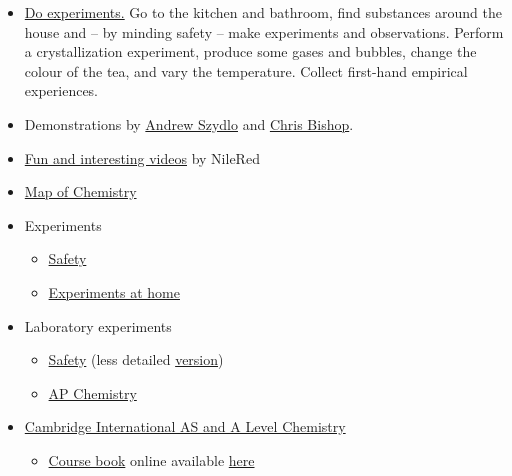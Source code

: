 \documentclass{article}
\begin{document}
\begin{itemize}
    \item \underline{Do experiments.} Go to the kitchen and bathroom, find substances around the house and -- by minding safety -- make experiments and observations. Perform a crystallization experiment, produce some gases and bubbles, change the colour of the tea, and vary the temperature. Collect first-hand empirical experiences.
    \item Demonstrations by \href{https://www.youtube.com/playlist?list=PLbnrZHfNEDZxPZ369tAF0wjnNo-A3EcDi}{Andrew Szydlo} and \href{https://www.youtube.com/watch?v=ti_E2ZKZpC4}{Chris Bishop}.
    \item \href{https://www.youtube.com/channel/UCFhXFikryT4aFcLkLw2LBLA}{Fun and interesting videos} by NileRed 
    
    \item \href{https://www.youtube.com/watch?v=P3RXtoYCW4M}{Map of Chemistry}
    
    
    \item Experiments
    \begin{itemize}
        \item \href{https://melscience.com/US-en/articles/safety-guide-conducting-chemical-reactions-home/}{Safety}
        \item \href{https://melscience.com/US-en/experiments/}{Experiments at home}
    \end{itemize}
    
    \item Laboratory experiments
    \begin{itemize}
        \item \href{https://www.youtube.com/watch?v=9o77QEeM-68}{Safety} (less detailed \href{https://www.youtube.com/watch?v=VRWRmIEHr3A}{version})
        \item \href{https://www.youtube.com/watch?v=6F6D3XuZDVo&list=PLC10F4535D849964F}{AP Chemistry}
    \end{itemize}
    
    \item \href{https://www.cambridgeinternational.org/programmes-and-qualifications/cambridge-international-as-and-a-level-chemistry-9701/}{Cambridge International AS and A Level Chemistry}
    \begin{itemize}
        \item \href{https://www.cambridge.org/gb/education/subject/science/chemistry/cambridge-international-a-level-chemistry-2nd-edition/cambridge-international-as-and-a-level-chemistry-2nd-edition-coursebook-cd-rom?isbn=9781107638457&format=WW}{Course book} online available \href{https://web.archive.org/web/20210411103136/https://www.gceguide.xyz/gce-e-books/cambridge-international-as-and-a-level-chemistry-coursebook-2nd-edition}{here}
    \end{itemize}
    

\end{itemize}
\end{document}
